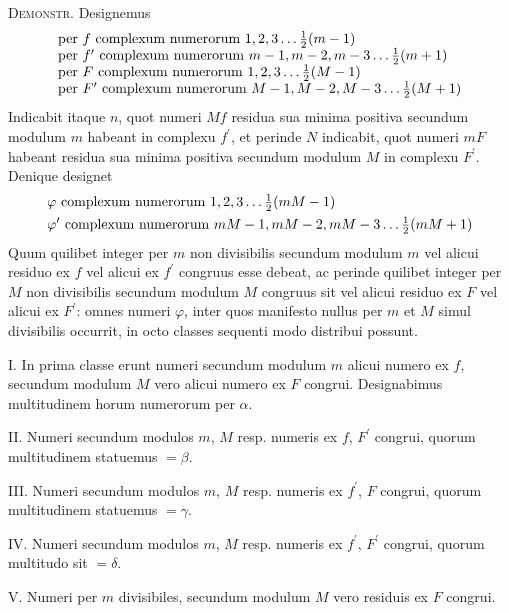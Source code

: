 \documentclass[twoside,12pt, showframe]{memoir}
\let\oldfrac\frac
\def\frac#1#2{\mathchoice{\tfrac{#1}{#2}}{\oldfrac{#1}{#2}}{\genfrac{}{}{}{2}{#1}{#2\mathstrut}}{\genfrac{}{}{}{3}{#1}{#2\mathstrut}}}
\begin{document}
\textsc{Demonstr.} Designemus
\[\begin{array}{l}
\text{per }f\text{ complexum numerorum }1,2,3 \ldots \frac{1}{2}(m-1) \\
\text{per }f^{\prime}\text{ complexum numerorum }m-1, m-2, m-3 \ldots \frac{1}{2}(m+1) \\
\text{per }F\text{ complexum numerorum }1,2,3 \ldots \frac{1}{2}({M}-1) \\
\text{per }F^{\prime}\text{ complexum numerorum }M-1, M-2, M-3 \ldots \frac{1}{2}(M+1)\\ 
\end{array}\]
Indicabit itaque \(n\), quot numeri \(M f\) residua sua minima positiva secundum modulum \(m\) habeant in complexu \(f^{\prime}\), et perinde \(N\) indicabit, quot numeri \(m F\) habeant residua sua minima positiva secundum modulum \(M\) in complexu \(F^{\prime}\). Denique designet\\
\[\begin{aligned}
&\varphi\text{ complexum numerorum }1, 2, 3 \ldots \frac{1}{2}(m M-1)\\
&\varphi^{\prime}\text{ complexum numerorum }m M-1, m M-2, m M-3 \ldots \frac{1}{2}(m M+1)
\end{aligned}\]
Quum quilibet integer per \(m\) non divisibilis secundum modulum \(m\) vel alicui residuo ex \(f\) vel alicui ex \(f^{\prime}\) congruus esse debeat, ac perinde quilibet integer per \(M\) non divisibilis secundum modulum \(M\) congruus sit vel alicui residuo ex \(F\) vel alicui ex \(F^{\prime}\): omnes numeri \(\varphi\), inter quos manifesto nullus per \(m\) et \(M\) simul divisibilis occurrit, in octo classes sequenti modo distribui possunt.

I. In prima classe erunt numeri secundum modulum \(m\) alicui numero ex \(f\), secundum modulum \(M\) vero alicui numero ex \(F\) congrui. Designabimus multitudinem horum numerorum per \(\alpha\).\clearpage\noindent%
 
II. Numeri secundum modulos \(m\), \(M\) resp. numeris ex \(f\), \(F^{\prime}\) congrui, quorum multitudinem statuemus \(=\beta\).
 
III. Numeri secundum modulos \(m\), \(M\) resp. numeris ex \(f^{\prime}\), \(F\) congrui, quorum multitudinem statuemus \(=\gamma\).
 
IV. Numeri secundum modulos \(m\), \(M\) resp. numeris ex \(f^{\prime}\), \(F^{\prime}\) congrui, quorum multitudo sit \(=\delta\).
 
V. Numeri per \(m\) divisibiles, secundum modulum \(M\) vero residuis ex \(F\) congrui.
 
\end{document}

